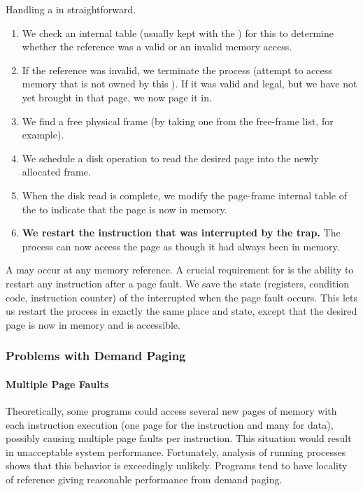 Handling a  in straightforward.
\begin{enumerate}[noitemsep]
\item We check an internal table (usually kept with the ) for this  to determine whether the reference was a valid or an invalid memory access.
\item If the reference was invalid, we terminate the process (attempt to access memory that is not owned by this ).
  If it was valid and legal, but we have not yet brought in that page, we now page it in.
\item We find a free physical frame (by taking one from the free-frame list, for example).
\item We schedule a disk operation to read the desired page into the newly allocated frame.
\item When the disk read is complete, we modify the page-frame internal table of the  to indicate that the page is now in memory.
\item \textbf{We restart the instruction that was interrupted by the trap.}
  The process can now access the page as though it had always been in memory.
\end{enumerate}

A  may occur at any memory reference.
A crucial requirement for  is the ability to restart any instruction after a page fault.
We save the state (registers, condition code, instruction counter) of the interrupted  when the page fault occurs.
This lets us restart the process in exactly the same place and state, except that the desired page is now in memory and is accessible.

\subsubsection{Problems with Demand Paging}\label{subsubsec:Demand_Paging_Problems}
\paragraph{Multiple Page Faults}\label{par:Demand_Paging_Problems-Multiple_Page_Faults}
Theoretically, some programs could access several new pages of memory with each instruction execution (one page for the instruction and many for data), possibly causing multiple page faults per instruction.
This situation would result in unacceptable system performance.
Fortunately, analysis of running processes shows that this behavior is exceedingly unlikely.
Programs tend to have locality of reference giving reasonable performance from demand paging.

